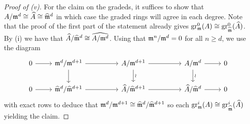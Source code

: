 \begin{proof}[Proof of (v)]
    For the claim on the gradeds, it suffices to show that $A/\mathfrak{m}^{d}\cong\widehat{A}\cong\widehat{\mathfrak{m}}^{d}$ in which case the graded rings will agree in each degree. Note that the proof of the first part of the statement already gives $\mathrm{gr}_{\mathfrak{m}}^{0}(A)\cong\mathrm{gr}_{\widehat{\mathfrak{m}}}^{0}(\widehat{A})$. By (i) we have that $\widehat{A}/\widehat{\mathfrak{m}}^{d}\cong\widehat{A/\mathfrak{m}^{d}}$. Using that $\mathfrak{m}^{n}/\mathfrak{m}^{d}=0$ for all $n\geq d$, we use the diagram 
    $$%
    \begin{tikzcd}
        0 & {\mfrak^{d}/\mfrak^{d+1}} && {A/\mfrak^{d+1}} && {A/\mfrak^{d}} & 0 \\
        0 & {\widehat{\mfrak}^{d}/\widehat{\mfrak}^{d+1}} && {\widehat{A}/\widehat{\mfrak}^{d+1}} && {\widehat{A}/\widehat{\mfrak}^{d}} & 0
        \arrow[from=1-1, to=1-2]
        \arrow[from=1-2, to=1-4]
        \arrow[from=1-2, to=2-2]
        \arrow[from=1-4, to=1-6]
        \arrow["\wr", from=1-4, to=2-4]
        \arrow[from=1-6, to=1-7]
        \arrow["\wr", from=1-6, to=2-6]
        \arrow[from=2-1, to=2-2]
        \arrow[from=2-2, to=2-4]
        \arrow[from=2-4, to=2-6]
        \arrow[from=2-6, to=2-7]
    \end{tikzcd}$$
    with exact rows to deduce that $\mathfrak{m}^{d}/\mathfrak{m}^{d+1}\cong\widehat{\mathfrak{m}}^{d}/\widehat{\mathfrak{m}}^{d+1}$ so each $\mathrm{gr}_{\mathfrak{m}}^{i}(A)\cong\mathrm{gr}_{\widehat{\mathfrak{m}}}^{i}(\widehat{A})$ yielding the claim. 
\end{proof}
